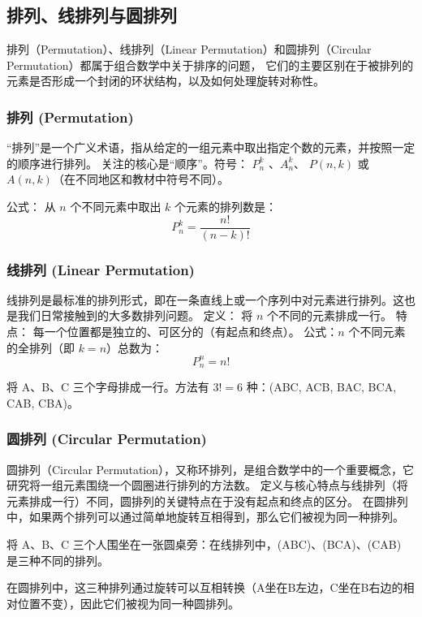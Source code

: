 \subsection{排列、线排列与圆排列}
\label{sec:arrangement-to-line-or-circle}
排列（Permutation）、线排列（Linear Permutation）和圆排列（Circular Permutation）都属于组合数学中关于排序的问题，
它们的主要区别在于被排列的元素是否形成一个封闭的环状结构，以及如何处理旋转对称性。 
\subsubsection{排列 (Permutation)}
“排列”是一个广义术语，指从给定的一组元素中取出指定个数的元素，并按照一定的顺序进行排列。
关注的核心是“顺序”。符号： \(P_n^k\) 、\(A_n^k\)、 \(P(n,k)\) 或 \(A(n,k)\)（在不同地区和教材中符号不同）。

公式： 从 \(n\) 个不同元素中取出 \(k\) 个元素的排列数是：
\[P_n^k=\frac{n!}{(n-k)!}\]

\subsubsection{线排列 (Linear Permutation)}
线排列是最标准的排列形式，即在一条直线上或一个序列中对元素进行排列。这也是我们日常接触到的大多数排列问题。
定义： 将 \(n\) 个不同的元素排成一行。
特点： 每一个位置都是独立的、可区分的（有起点和终点）。
公式：\(n\) 个不同元素的全排列（即 \(k=n\)）总数为：
\[P_n^n=n!\]

\begin{example}
将 A、B、C 三个字母排成一行。方法有 \(3!=6\) 种：(ABC, ACB, BAC, BCA, CAB, CBA)。
\end{example}

\subsubsection{圆排列 (Circular Permutation)}

圆排列（Circular Permutation），又称环排列，是组合数学中的一个重要概念，它研究将一组元素围绕一个圆圈进行排列的方法数。
定义与核心特点与线排列（将元素排成一行）不同，圆排列的关键特点在于没有起点和终点的区分。
在圆排列中，如果两个排列可以通过简单地旋转互相得到，那么它们被视为同一种排列。

\begin{example}
将 A、B、C 三个人围坐在一张圆桌旁：在线排列中，(ABC)、(BCA)、(CAB) 是三种不同的排列。

在圆排列中，这三种排列通过旋转可以互相转换（A坐在B左边，C坐在B右边的相对位置不变），因此它们被视为同一种圆排列。
\end{example}

